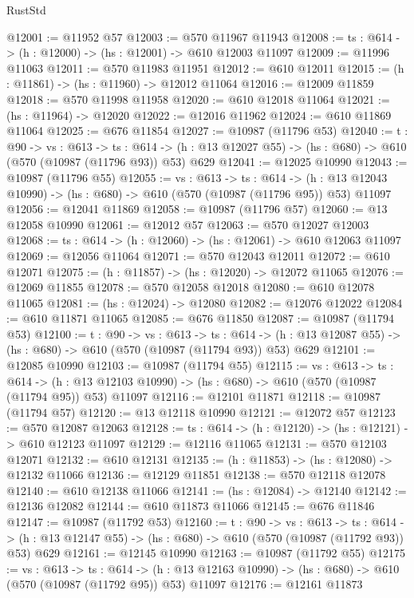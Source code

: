 \begin{lexlean}{RustStd}
\begin{coremodule}
@12001 := @11952 @57
@12003 := @570 @11967 @11943
@12008 := {ts : @614} -> (h : @12000) -> (hs : @12001) -> @610 @12003 @11097
@12009 := @11996 @11063
@12011 := @570 @11983 @11951
@12012 := @610 @12011
@12015 := (h : @11861) -> (hs : @11960) -> @12012 @11064
@12016 := @12009 @11859
@12018 := @570 @11998 @11958
@12020 := @610 @12018 @11064
@12021 := (hs : @11964) -> @12020
@12022 := @12016 @11962
@12024 := @610 @11869 @11064
@12025 := @676 @11854
@12027 := @10987 (@11796 @53)
@12040 := {t : @90} ->
  {vs : @613} ->
  {ts : @614} -> (h : @13 @12027 @55) -> (hs : @680) -> @610 (@570 (@10987 (@11796 @93)) @53) @629
@12041 := @12025 @10990
@12043 := @10987 (@11796 @55)
@12055 := {vs : @613} ->
  {ts : @614} ->
  (h : @13 @12043 @10990) -> (hs : @680) -> @610 (@570 (@10987 (@11796 @95)) @53) @11097
@12056 := @12041 @11869
@12058 := @10987 (@11796 @57)
@12060 := @13 @12058 @10990
@12061 := @12012 @57
@12063 := @570 @12027 @12003
@12068 := {ts : @614} -> (h : @12060) -> (hs : @12061) -> @610 @12063 @11097
@12069 := @12056 @11064
@12071 := @570 @12043 @12011
@12072 := @610 @12071
@12075 := (h : @11857) -> (hs : @12020) -> @12072 @11065
@12076 := @12069 @11855
@12078 := @570 @12058 @12018
@12080 := @610 @12078 @11065
@12081 := (hs : @12024) -> @12080
@12082 := @12076 @12022
@12084 := @610 @11871 @11065
@12085 := @676 @11850
@12087 := @10987 (@11794 @53)
@12100 := {t : @90} ->
  {vs : @613} ->
  {ts : @614} -> (h : @13 @12087 @55) -> (hs : @680) -> @610 (@570 (@10987 (@11794 @93)) @53) @629
@12101 := @12085 @10990
@12103 := @10987 (@11794 @55)
@12115 := {vs : @613} ->
  {ts : @614} ->
  (h : @13 @12103 @10990) -> (hs : @680) -> @610 (@570 (@10987 (@11794 @95)) @53) @11097
@12116 := @12101 @11871
@12118 := @10987 (@11794 @57)
@12120 := @13 @12118 @10990
@12121 := @12072 @57
@12123 := @570 @12087 @12063
@12128 := {ts : @614} -> (h : @12120) -> (hs : @12121) -> @610 @12123 @11097
@12129 := @12116 @11065
@12131 := @570 @12103 @12071
@12132 := @610 @12131
@12135 := (h : @11853) -> (hs : @12080) -> @12132 @11066
@12136 := @12129 @11851
@12138 := @570 @12118 @12078
@12140 := @610 @12138 @11066
@12141 := (hs : @12084) -> @12140
@12142 := @12136 @12082
@12144 := @610 @11873 @11066
@12145 := @676 @11846
@12147 := @10987 (@11792 @53)
@12160 := {t : @90} ->
  {vs : @613} ->
  {ts : @614} -> (h : @13 @12147 @55) -> (hs : @680) -> @610 (@570 (@10987 (@11792 @93)) @53) @629
@12161 := @12145 @10990
@12163 := @10987 (@11792 @55)
@12175 := {vs : @613} ->
  {ts : @614} ->
  (h : @13 @12163 @10990) -> (hs : @680) -> @610 (@570 (@10987 (@11792 @95)) @53) @11097
@12176 := @12161 @11873

\end{coremodule}
\end{lexlean}
